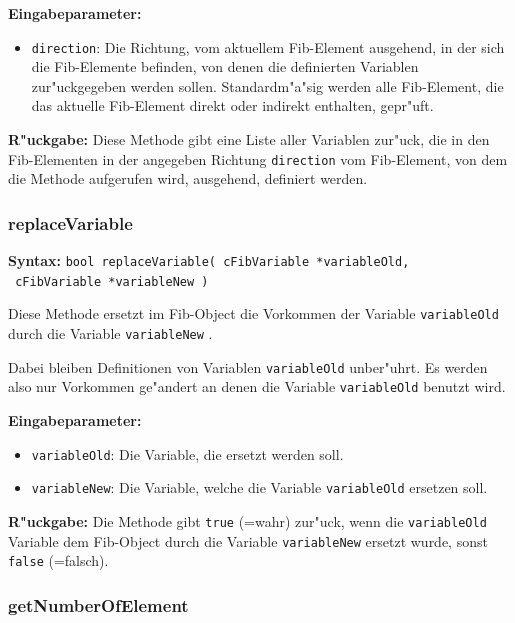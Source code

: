 \bigskip\noindent
\textbf{Eingabeparameter:} 
\begin{itemize}
 \item \verb|direction|: Die Richtung, vom aktuellem Fib-Element ausgehend, in der sich die Fib-Elemente befinden, von denen die definierten Variablen zur"uckgegeben werden sollen. Standardm"a"sig werden alle Fib-Element, die das aktuelle Fib-Element direkt oder indirekt enthalten, gepr"uft.
\end{itemize}

\bigskip\noindent
\textbf{R"uckgabe:} Diese Methode gibt eine Liste aller Variablen zur"uck, die in den Fib-Elementen in der angegeben Richtung \verb|direction| vom Fib-Element, von dem die Methode aufgerufen wird, ausgehend, definiert werden.


\subsubsection{replaceVariable}

\textbf{Syntax:} \verb|bool replaceVariable( cFibVariable *variableOld,| \\\verb| cFibVariable *variableNew )|

\bigskip\noindent
Diese Methode ersetzt im Fib-Object die Vorkommen der Variable \verb|variableOld| durch die Variable \verb|variableNew| .

Dabei bleiben Definitionen von Variablen \verb|variableOld| unber"uhrt. Es werden also nur Vorkommen ge"andert an denen die Variable \verb|variableOld| benutzt wird.

\bigskip\noindent
\textbf{Eingabeparameter:} 
\begin{itemize}
 \item \verb|variableOld|: Die Variable, die ersetzt werden soll.
 \item \verb|variableNew|: Die Variable, welche die Variable \verb|variableOld| ersetzen soll.
\end{itemize}

\bigskip\noindent
\textbf{R"uckgabe:} Die Methode gibt \verb|true| (=wahr) zur"uck, wenn die \verb|variableOld| Variable dem Fib-Object durch die Variable \verb|variableNew| ersetzt wurde, sonst \verb|false| (=falsch).


\subsubsection{getNumberOfElement}

